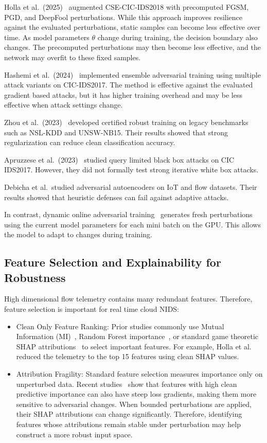 \documentclass[conference]{IEEEtran}
\begin{document}
Holla et al.\ (2025)~\cite{ref4} augmented CSE-CIC-IDS2018 with precomputed FGSM, PGD, and DeepFool perturbations. While this approach improves resilience against the evaluated perturbations, static samples can become less effective over time. As model parameters $\theta$ change during training, the decision boundary also changes. The precomputed perturbations may then become less effective, and the network may overfit to these fixed samples.

Hashemi et al.\ (2024)~\cite{ref13} implemented ensemble adversarial training using multiple attack variants on CIC-IDS2017. The method is effective against the evaluated gradient based attacks, but it has higher training overhead and may be less effective when attack settings change.

Zhou et al.\ (2023)~\cite{ref11} developed certified robust training on legacy benchmarks such as NSL-KDD and UNSW-NB15. Their results showed that strong regularization can reduce clean classification accuracy.

Apruzzese et al.\ (2023)~\cite{ref14} studied query limited black box attacks on CIC IDS2017. However, they did not formally test strong iterative white box attacks.

Debicha et al.\ studied adversarial autoencoders on IoT and flow datasets. Their results showed that heuristic defenses can fail against adaptive attacks.

In contrast, dynamic online adversarial training~\cite{ref5} generates fresh perturbations using the current model parameters for each mini batch on the GPU. This allows the model to adapt to changes during training.

\subsection{Feature Selection and Explainability for Robustness}
High dimensional flow telemetry contains many redundant features. Therefore, feature selection is important for real time cloud NIDS:
\begin{itemize}
    \item Clean Only Feature Ranking: Prior studies commonly use Mutual Information (MI)~\cite{ref12}, Random Forest importance~\cite{ref13}, or standard game theoretic SHAP attributions~\cite{ref6} to select important features. For example, Holla et al.~\cite{ref4} reduced the telemetry to the top 15 features using clean SHAP values.
    \item Attribution Fragility: Standard feature selection measures importance only on unperturbed data. Recent studies~\cite{ref4,ref13} show that features with high clean predictive importance can also have steep loss gradients, making them more sensitive to adversarial changes. When bounded perturbations are applied, their SHAP attributions can change significantly. Therefore, identifying features whose attributions remain stable under perturbation may help construct a more robust input space.
\end{itemize}
\end{document}
